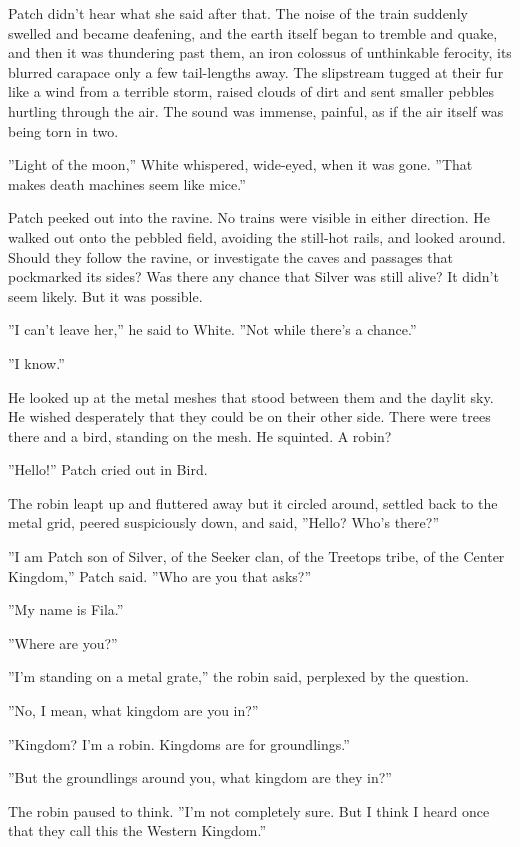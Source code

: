 \documentclass[12pt]{book}
\begin{document}
 Patch didn't hear what she said after that. The noise of the train suddenly swelled and became deafening, and the earth itself began to tremble and quake, and then it was thundering past them, an iron colossus of unthinkable ferocity, its blurred carapace only a few tail-lengths away. The slipstream tugged at their fur like a wind from a terrible storm, raised clouds of dirt and sent smaller pebbles hurtling through the air. The sound was immense, painful, as if the air itself was being torn in two.\par
 ''Light of the moon,'' White whispered, wide-eyed, when it was gone. ''That makes death machines seem like mice.''\par
 Patch peeked out into the ravine. No trains were visible in either direction. He walked out onto the pebbled field, avoiding the still-hot rails, and looked around. Should they follow the ravine, or investigate the caves and passages that pockmarked its sides? Was there any chance that Silver was still alive? It didn't seem likely. But it was possible.\par
 ''I can't leave her,'' he said to White. ''Not while there's a chance.''\par
 ''I know.''\par
 He looked up at the metal meshes that stood between them and the daylit sky. He wished desperately that they could be on their other side. There were trees there %
 and a bird, standing on the mesh. He squinted. A robin?\par
 ''Hello!'' Patch cried out in Bird.\par
 The robin leapt up and fluttered away %
 but it circled around, settled back to the metal grid, peered suspiciously down, and said, ''Hello? Who's there?''\par
 ''I am Patch son of Silver, of the Seeker clan, of the Treetops tribe, of the Center Kingdom,'' Patch said. ''Who are you that asks?''\par
 ''My name is Fila.''\par
 ''Where are you?''\par
 ''I'm standing on a metal grate,'' the robin said, perplexed by the question.\par
 ''No, I mean, what kingdom are you in?''\par
 ''Kingdom? I'm a robin. Kingdoms are for groundlings.''\par
 ''But the groundlings around you, what kingdom are they in?''\par
 The robin paused to think. ''I'm not completely sure. But I think I heard once that they call this the Western Kingdom.''\par
\end{document}
